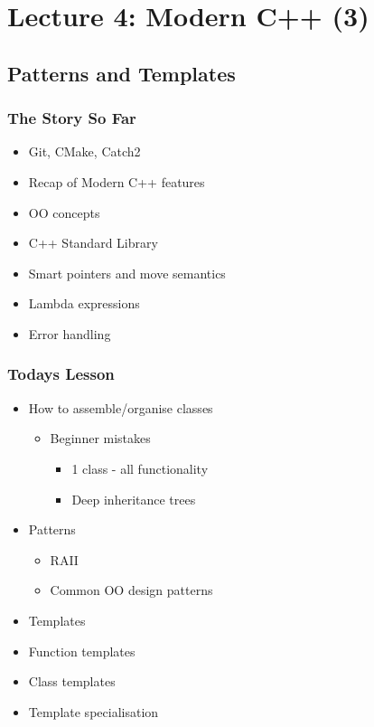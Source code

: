 \section{Lecture 4: Modern C++ (3)}\label{lecture-4-modern-c-3}

\subsection{Patterns and Templates}\label{patterns-and-templates}

\subsubsection{The Story So Far}\label{the-story-so-far-2}

\begin{itemize}
\itemsep1pt\parskip0pt
\item
  Git, CMake, Catch2
\item
  Recap of Modern C++ features
\item
  OO concepts
\item
  C++ Standard Library
\item
  Smart pointers and move semantics
\item
  Lambda expressions
\item
  Error handling
\end{itemize}

\subsubsection{Todays Lesson}\label{todays-lesson-2}

\begin{itemize}
\itemsep1pt\parskip0pt
\item
  How to assemble/organise classes

  \begin{itemize}
  \itemsep1pt\parskip0pt
  \item
    Beginner mistakes

    \begin{itemize}
    \itemsep1pt\parskip0pt
    \item
      1 class - all functionality
    \item
      Deep inheritance trees
    \end{itemize}
  \end{itemize}
\item
  Patterns

  \begin{itemize}
  \itemsep1pt\parskip0pt
  \item
    RAII
  \item
    Common OO design patterns
  \end{itemize}
\item
  Templates
\item
  Function templates
\item
  Class templates
\item
  Template specialisation
\end{itemize}

